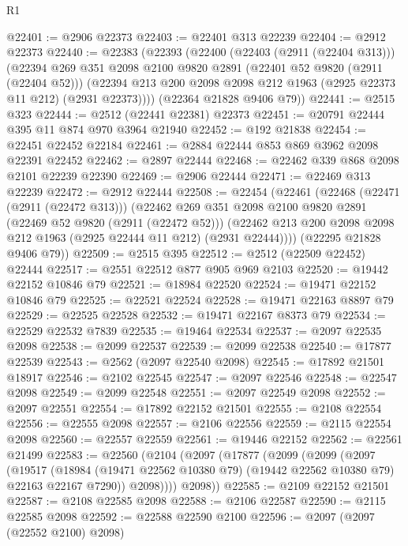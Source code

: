 \begin{lexlean}{R1}
\begin{coremodule}
@22401 := @2906 @22373
@22403 := @22401 @313 @22239
@22404 := @2912 @22373
@22440 := @22383
    (@22393
      (@22400
        (@22403 (@2911 (@22404 @313)))
        (@22394
          @269
          @351
          @2098
          @2100
          @9820
          @2891
          (@22401 @52 @9820 (@2911 (@22404 @52)))
          (@22394 @213 @200 @2098 @2098 @212 @1963 (@2925 @22373 @11 @212) (@2931 @22373))))
      (@22364 @21828 @9406 @79))
@22441 := @2515 @323
@22444 := @2512 (@22441 @22381) @22373
@22451 := @20791 @22444 @395 @11 @874 @970 @3964 @21940
@22452 := @192 @21838
@22454 := @22451 @22452 @22184
@22461 := @2884 @22444 @853 @869 @3962 @2098 @22391 @22452
@22462 := @2897 @22444
@22468 := @22462 @339 @868 @2098 @2101 @22239 @22390
@22469 := @2906 @22444
@22471 := @22469 @313 @22239
@22472 := @2912 @22444
@22508 := @22454
    (@22461
      (@22468
        (@22471 (@2911 (@22472 @313)))
        (@22462
          @269
          @351
          @2098
          @2100
          @9820
          @2891
          (@22469 @52 @9820 (@2911 (@22472 @52)))
          (@22462 @213 @200 @2098 @2098 @212 @1963 (@2925 @22444 @11 @212) (@2931 @22444))))
      (@22295 @21828 @9406 @79))
@22509 := @2515 @395
@22512 := @2512 (@22509 @22452) @22444
@22517 := @2551 @22512 @877 @905 @969 @2103
@22520 := @19442 @22152 @10846 @79
@22521 := @18984 @22520
@22524 := @19471 @22152 @10846 @79
@22525 := @22521 @22524
@22528 := @19471 @22163 @8897 @79
@22529 := @22525 @22528
@22532 := @19471 @22167 @8373 @79
@22534 := @22529 @22532 @7839
@22535 := @19464 @22534
@22537 := @2097 @22535 @2098
@22538 := @2099 @22537
@22539 := @2099 @22538
@22540 := @17877 @22539
@22543 := @2562 (@2097 @22540 @2098)
@22545 := @17892 @21501 @18917
@22546 := @2102 @22545
@22547 := @2097 @22546
@22548 := @22547 @2098
@22549 := @2099 @22548
@22551 := @2097 @22549 @2098
@22552 := @2097 @22551
@22554 := @17892 @22152 @21501
@22555 := @2108 @22554
@22556 := @22555 @2098
@22557 := @2106 @22556
@22559 := @2115 @22554 @2098
@22560 := @22557 @22559
@22561 := @19446 @22152
@22562 := @22561 @21499
@22583 := @22560
    (@2104
      (@2097
        (@17877
          (@2099
            (@2099
              (@2097
                (@19517
                  (@18984
                    (@19471 @22562 @10380 @79)
                    (@19442 @22562 @10380 @79)
                    @22163
                    @22167
                    @7290))
                @2098))))
        @2098))
@22585 := @2109 @22152 @21501
@22587 := @2108 @22585 @2098
@22588 := @2106 @22587
@22590 := @2115 @22585 @2098
@22592 := @22588 @22590 @2100
@22596 := @2097 (@2097 (@22552 @2100) @2098)

\end{coremodule}
\end{lexlean}
